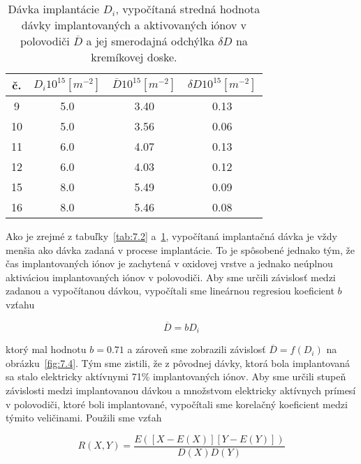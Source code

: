 \begin{table}[h!]\centering
  \begin{minipage}[c]{\myfiguresize}
    \begin{center}
      \begin{tabular}{c c c c}
        č. & $D_{i} 10^{15} [m^{-2}]$ & $\overline D 10^{15} [m^{-2}]$ & $\delta D 10^{15} [m^{-2}]$\\
        \hline
         9 & 5.0 & 3.40 & 0.13\\
        10 & 5.0 & 3.56 & 0.06\\
        11 & 6.0 & 4.07 & 0.13\\
        12 & 6.0 & 4.03 & 0.12\\
        15 & 8.0 & 5.49 & 0.09\\
        16 & 8.0 & 5.46 & 0.08\\
      \end{tabular}
    \end{center}
    \caption[Dávka implantácie $D_{i}$]{Dávka implantácie $D_{i}$,
      vypočítaná stredná hodnota dávky implantovaných a aktivovaných
      iónov v polovodiči $\overline D$ a jej smerodajná odchýlka
      $\delta D$ na kremíkovej doske.}\label{tab:7.3}
  \end{minipage}
\end{table}

Ako je zrejmé z tabuľky~\ref{tab:7.2} a~\ref{tab:7.3}, vypočítaná
implantačná dávka je vždy menšia ako dávka zadaná v procese
implantácie. To je spôsobené jednako tým, že čas implantovaných iónov
je zachytená v oxidovej vrstve a jednako neúplnou aktiváciou
implantovaných iónov v polovodiči. Aby sme určili závislosť medzi
zadanou a vypočítanou dávkou, vypočítali sme lineárnou regresiou
koeficient $b$ vzťahu

\begin{equation}\label{eq:7.1}
  \overline D = bD_{i}
\end{equation}

ktorý mal hodnotu $b = 0.71$ a zároveň sme zobrazili závislosť
$\overline D = f(D_{i})$ na obrázku~\ref{fig:7.4}. Tým sme zistili, že
z pôvodnej dávky, ktorá bola implantovaná sa stalo elektricky
aktívnymi 71\% implantovaných iónov. Aby sme určili stupeň závislosti
medzi implantovanou dávkou a množstvom elektricky aktívnych prímesí v
polovodiči, ktoré boli implantované, vypočítali sme korelačný
koeficient medzi týmito veličinami. Použili sme vzťah

\begin{equation}\label{eq:7.2}
  R(X,Y) = \frac{E([X-E(X)][Y-E(Y)])}{D(X)D(Y)}
\end{equation}

